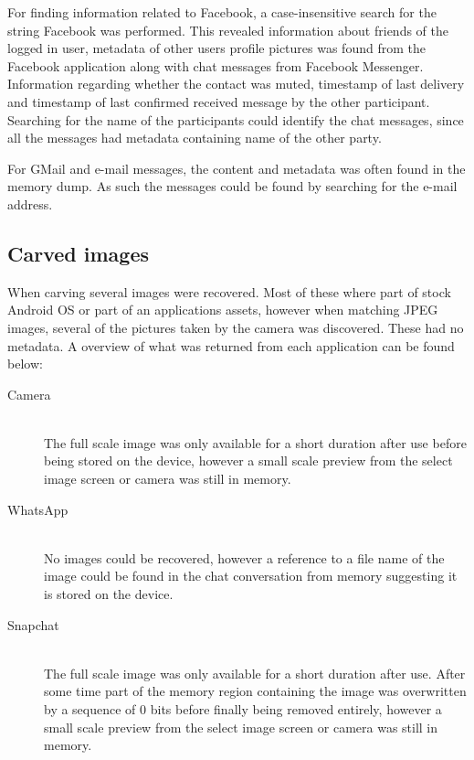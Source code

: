 For finding information related to Facebook, a case-insensitive search for the string Facebook was performed. This revealed information about friends of the logged in user, metadata of other users profile pictures was found from the Facebook application along with chat messages from Facebook Messenger. Information regarding whether the contact was muted, timestamp of last delivery and timestamp of last confirmed received message by the other participant. Searching for the name of the participants could identify the chat messages, since all the messages had metadata containing name of the other party.

For GMail and e-mail messages, the content and metadata was often found in the memory dump. As such the messages could be found by searching for the e-mail address.

\subsection{Carved images}
When carving several images were recovered. Most of these where part of stock Android OS or part of an applications assets, however when matching JPEG images, several of the pictures taken by the camera was discovered. These had no metadata. A overview of what was returned from each application can be found below:
\begin{description}
\item[Camera]\hfill\\
The full scale image was only available for a short duration after use before being stored on the device, however a small scale preview from the select image screen or camera was still in memory.
\item[WhatsApp]\hfill\\
No images could be recovered, however a reference to a file name of the image could be found in the chat conversation from memory suggesting it is stored on the device.
\item[Snapchat]\hfill\\
The full scale image was only available for a short duration after use. After some time part of the memory region containing the image was overwritten by a sequence of 0 bits before finally being removed entirely, however a small scale preview from the select image screen or camera was still in memory.
\end{description}